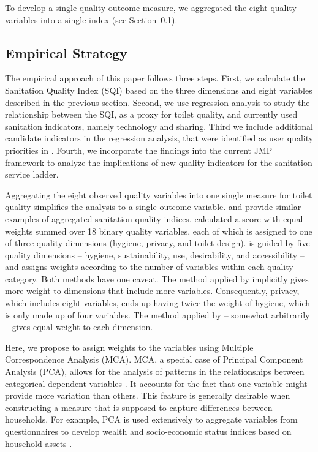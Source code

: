 \documentclass[natbib]{svjour3}                     %
\begin{document}
To develop a single quality outcome measure, we aggregated the eight quality variables into a single index (see Section~\ref{sec:empirical}). 

\FloatBarrier

\subsection{Empirical Strategy}
\label{sec:empirical}
The empirical approach of this paper follows three steps. First, we calculate the Sanitation Quality Index (SQI) based on the three dimensions and eight variables described in the previous section. Second, we use regression analysis to study the relationship between the SQI, as a proxy for toilet quality, and currently used sanitation indicators, namely technology and sharing. Third we include additional candidate indicators in the regression analysis, that were identified as user quality priorities in \citet{Schelbert2020}. Fourth, we incorporate the findings into the current JMP framework to analyze the implications of new quality indicators for the sanitation service ladder.

Aggregating the eight observed quality variables into one single measure for toilet quality simplifies the analysis to a single outcome variable. \citet{Simiyu2017c} and \citet{Tidwell2018} provide similar examples of aggregated sanitation quality indices. \citet{Simiyu2017c} calculated a score with equal weights summed over 18 binary quality variables, each of which is assigned to one of three quality dimensions (hygiene, privacy, and toilet design). \citet{Tidwell2018} is guided by five quality dimensions -- hygiene, sustainability, use, desirability, and accessibility -- and assigns weights according to the number of variables within each quality category. Both methods have one caveat. The method applied by \citet{Simiyu2017c} implicitly gives more weight to dimensions that include more variables. Consequently, privacy, which includes eight variables, ends up having twice the weight of hygiene, which is only made up of four variables. The method applied by \citet{Tidwell2018} -- somewhat arbitrarily -- gives equal weight to each dimension.

Here, we propose to assign weights to the variables using Multiple Correspondence Analysis (MCA). MCA, a special case of Principal Component Analysis (PCA), allows for the analysis of patterns in the relationships between categorical dependent variables \citep{Abdi2007}. It accounts for the fact that one variable might provide more variation than others. This feature is generally desirable when constructing a measure that is supposed to capture differences between households. For example, PCA is used extensively to aggregate variables from questionnaires to develop wealth and socio-economic status indices based on household assets \citep{Filmer2001, McKenzie2005, Vyas2006}. 
\end{document}
